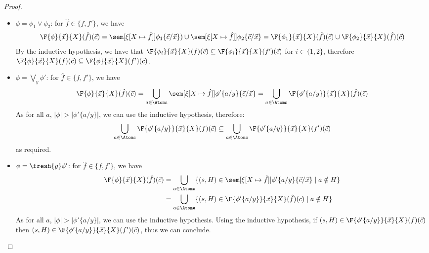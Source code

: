 \begin{proof}
\begin{itemize}
\begin{align*}
		\end{align*}
		By the inductive hypothesis, we have that $\F{\phi'}{\vec x}{X}(f) \sqsupseteq \F{\phi'}{\vec x}{X}(f')$, meaning for all $\vec c \in \Atoms^{|\vec x|}$, we have that
		\begin{align*}
			\gap\F{\phi'}{\vec x}{X}(f)(\vec c) \supseteq \F{\phi'}{\vec x}{X}(f')(\vec c) \\
			\therefore\gap\F{\phi}{\vec x}{X}(f)(\vec c) \subseteq \F{\phi}{\vec x}{X}(f')(\vec c)
		\end{align*}
		as required.
		Note we use the second inductive hypothesis as $\lnot \phi'$ has one more negation than $\phi'$.
				\item $\phi = \phi_1 \lor \phi_2$: for $\hat f \in \{f, f'\}$, we have
		\[
		\F{\phi}{\vec x}{X}(\hat f)(\vec c) = \sem[{\xi[X\mapsto \hat f]}]{\phi_1\{\vec c / \vec x\})} \cup \sem[{\xi[X\mapsto \hat f]}]{\phi_2\{\vec c / \vec x\}} = \F{\phi_1}{\vec x}{X}(\hat f)(\vec c) \cup \F{\phi_2}{\vec x}{X}(\hat f)(\vec c)
		\]
		By the inductive hypothesis, we have that $\F{\phi_i}{\vec x}{X}(f)(\vec c) \subseteq \F{\phi_i}{\vec x}{X}(f')(\vec c)$ for $i \in \{1,2\}$,
		therefore
		$\F{\phi}{\vec x}{X}(f)(\vec c)\subseteq \F{\phi}{\vec x}{X}(f')(\vec c)$.
		\item $\phi = \bigvee_{y} \phi'$: for $\hat f \in \{f,f'\}$, we have
		\[
		\F{\phi}{\vec x}{X}(\hat f)(\vec c) = \bigcup_{a\in \Atoms}\sem[{\xi[X\mapsto \hat f]}]{\phi'\{a/y\}\{\vec c / \vec x\}} = \bigcup_{a \in \Atoms}\F{\phi'\{a/y\}}{\vec x}{X}(\hat f)(\vec c)
		\]
		As for all $a$, $|\phi| > |\phi'\{a/y\}|$, we can use the inductive hypothesis, therefore:    \[
		\bigcup_{a \in \Atoms}\F{\phi'\{a/y\}}{\vec x}{X}(f)(\vec c) \subseteq  \bigcup_{a \in \Atoms}\F{\phi'\{a/y\}}{\vec x}{X}(f')(\vec c)
		\]
		as required.
	    \item $\phi = \fresh{y} \phi'$: for $\hat f \in \{f,f'\}$, we have
		\begin{align*}
			\F{\phi}{\vec x}{X}(\hat f)(\vec c) &= \bigcup_{a\in \Atoms}\{(s, H) \in \sem[{\xi[X\mapsto \hat f]}]{\phi'\{a/y\}\{\vec c/\vec x\}} \mid a \notin H\} 
			\\ &= \bigcup_{a \in \Atoms}\{(s, H) \in \F{\phi'\{a/y\}}{\vec x}{X}(\hat f)(\vec c) \mid a \notin H\}
		\end{align*}
		As for all $a$, $|\phi| > |\phi'\{a/y\}|$, we can use the inductive hypothesis.
		Using the inductive hypothesis, if $(s, H) \in \F{\phi'\{a/y\}}{\vec x}{X}(f)(\vec c)$ then $(s, H) \in \F{\phi'\{a/y\}}{\vec x}{X}(f')(\vec c)$, thus we can conclude.

\end{itemize}
\end{proof}
